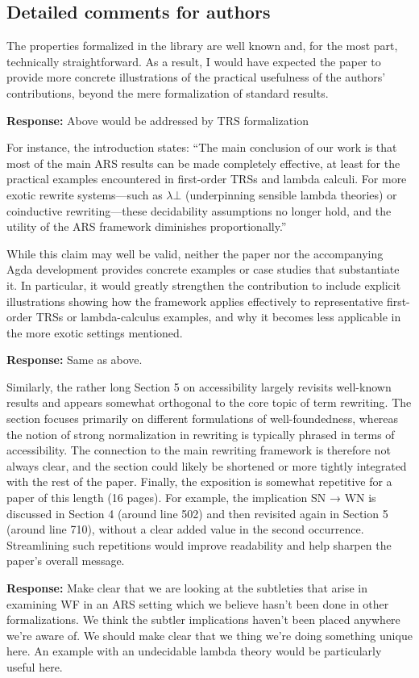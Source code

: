 \documentclass[11pt]{article}
\newcommand{\res}[1]{\par\noindent\textbf{Response:} #1\par}
\begin{document}
\subsection*{Detailed comments for authors}

The properties formalized in the library are well known and, for the most part, technically straightforward. As a result, I would have expected the paper to provide more concrete illustrations of the practical usefulness of the authors’ contributions, beyond the mere formalization of standard results.
\res{Above would be addressed by TRS formalization}
For instance, the introduction states:
“The main conclusion of our work is that most of the main ARS results can be made completely effective, at least for the practical examples encountered in first-order TRSs and lambda calculi. For more exotic rewrite systems—such as $\lambda \bot$ (underpinning sensible lambda theories) or coinductive rewriting—these decidability assumptions no longer hold, and the utility of the ARS framework diminishes proportionally.”

While this claim may well be valid, neither the paper nor the accompanying Agda development provides concrete examples or case studies that substantiate it. In particular, it would greatly strengthen the contribution to include explicit illustrations showing how the framework applies effectively to representative first-order TRSs or lambda-calculus examples, and why it becomes less applicable in the more exotic settings mentioned.
\res{Same as above.}

Similarly, the rather long Section 5 on accessibility largely revisits well-known results and appears somewhat orthogonal to the core topic of term rewriting. The section focuses primarily on different formulations of well-foundedness, whereas the notion of strong normalization in rewriting is typically phrased in terms of accessibility. The connection to the main rewriting framework is therefore not always clear, and the section could likely be shortened or more tightly integrated with the rest of the paper.
Finally, the exposition is somewhat repetitive for a paper of this length (16 pages). For example, the implication SN → WN is discussed in Section 4 (around line 502) and then revisited again in Section 5 (around line 710), without a clear added value in the second occurrence. Streamlining such repetitions would improve readability and help sharpen the paper’s overall message.
\res{Make clear that we are looking at the subtleties that arise in examining WF in an ARS setting which we believe hasn't been done in other formalizations. We think the subtler implications haven't been placed anywhere we're aware of. We should make clear that we thing we're doing something unique here. An example with an undecidable lambda theory would be particularly useful here.}
\end{document}
